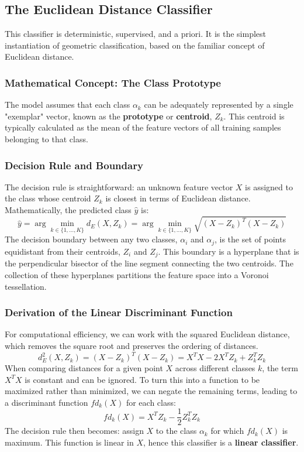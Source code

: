 \subsection*{The Euclidean Distance Classifier}
This classifier is deterministic, supervised, and a priori. It is the simplest instantiation of geometric classification, based on the familiar concept of Euclidean distance.

\subsubsection*{Mathematical Concept: The Class Prototype}
The model assumes that each class $\alpha_k$ can be adequately represented by a single "exemplar" vector, known as the \textbf{prototype} or \textbf{centroid}, $Z_k$. This centroid is typically calculated as the mean of the feature vectors of all training samples belonging to that class.

\subsubsection*{Decision Rule and Boundary}
The decision rule is straightforward: an unknown feature vector $X$ is assigned to the class whose centroid $Z_k$ is closest in terms of Euclidean distance. Mathematically, the predicted class $\hat{y}$ is:
$$ \hat{y} = \arg\min_{k \in \{1, \dots, K\}} d_E(X, Z_k) = \arg\min_{k \in \{1, \dots, K\}} \sqrt{(X - Z_k)^T (X - Z_k)} $$
The decision boundary between any two classes, $\alpha_i$ and $\alpha_j$, is the set of points equidistant from their centroids, $Z_i$ and $Z_j$. This boundary is a hyperplane that is the perpendicular bisector of the line segment connecting the two centroids. The collection of these hyperplanes partitions the feature space into a Voronoi tessellation.

\subsubsection*{Derivation of the Linear Discriminant Function}
For computational efficiency, we can work with the squared Euclidean distance, which removes the square root and preserves the ordering of distances.
$$ d_E^2(X, Z_k) = (X - Z_k)^T (X - Z_k) = X^T X - 2X^T Z_k + Z_k^T Z_k $$
When comparing distances for a given point $X$ across different classes $k$, the term $X^T X$ is constant and can be ignored. To turn this into a function to be maximized rather than minimized, we can negate the remaining terms, leading to a discriminant function $fd_k(X)$ for each class:
$$ fd_k(X) = X^T Z_k - \frac{1}{2} Z_k^T Z_k $$
The decision rule then becomes: assign $X$ to the class $\alpha_k$ for which $fd_k(X)$ is maximum. This function is linear in $X$, hence this classifier is a \textbf{linear classifier}.

